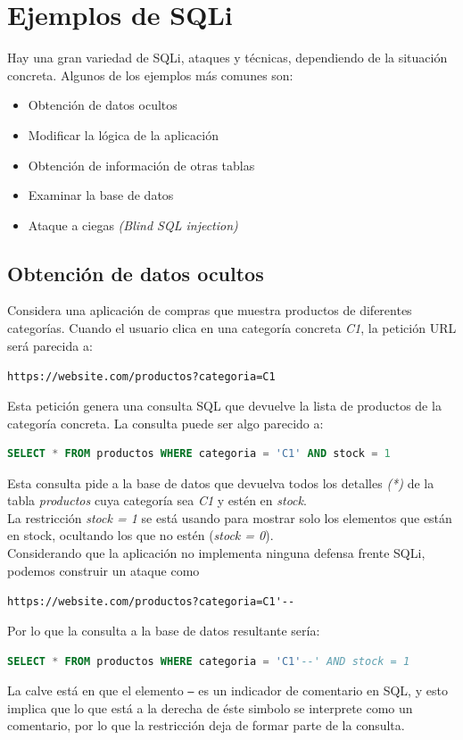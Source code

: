 \documentclass[bibliography=totocnumbered]{scrartcl}
\begin{document}
\section{Ejemplos de SQLi}
Hay una gran variedad de SQLi, ataques y técnicas, dependiendo de la situación concreta. Algunos de los ejemplos más comunes son:
\begin{itemize}
    \item Obtención de datos ocultos
    \item Modificar la lógica de la aplicación
    \item Obtención de información de otras tablas
    \item Examinar la base de datos
    \item Ataque a ciegas \textit{(Blind SQL injection)}
\end{itemize}

\subsection{Obtención de datos ocultos}
Considera una aplicación de compras que muestra productos de diferentes categorías. Cuando el usuario clica en una categoría concreta \textit{C1}, la petición URL será parecida a:
\begin{center}
\nolinkurl{https://website.com/productos?categoria=C1}
\end{center}
Esta petición genera una consulta SQL que devuelve la lista de productos de la categoría concreta. La consulta puede ser algo parecido a:
\begin{lstlisting}[language=SQL]
        SELECT * FROM productos WHERE categoria = 'C1' AND stock = 1
\end{lstlisting}
Esta consulta pide a la base de datos que devuelva todos los detalles \textit{(*)} de la tabla \textit{productos} cuya categoría sea \textit{C1} y estén en \textit{stock}.\\
La restricción \textit{stock = 1} se está usando para mostrar solo los elementos que están en stock, ocultando los que no estén (\textit{stock = 0}).\\

Considerando que la aplicación no implementa ninguna defensa frente SQLi, podemos construir un ataque como
\begin{center}
\nolinkurl{https://website.com/productos?categoria=C1'--}
\end{center}
Por lo que la consulta a la base de datos resultante sería:
\begin{lstlisting}[language=SQL]
        SELECT * FROM productos WHERE categoria = 'C1'--' AND stock = 1
\end{lstlisting}
La calve está en que el elemento \textit{\texttt{--}} es un indicador de comentario en SQL, y esto implica que lo que está a la derecha de éste simbolo se interprete como un comentario, por lo que la restricción deja de formar parte de la consulta.\\
\end{document}
